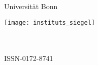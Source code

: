 %
%
%
{\thispagestyle{empty}
  \addtolength{\oddsidemargin}{1.0cm}\addtolength{\topmargin}{1.0cm}
  \rmfamily\setlength{\parindent}{0pt}
  \begin{center}
    {\fontsize{44}{50}\selectfont
      Universität Bonn}

    \vspace*{20pt}

    \begin{singlespace}
      \fontsize{30}{40}\selectfont
      \InstituteName
    \end{singlespace}

    \vspace*{40pt}

    \begin{onehalfspace}
      \bfseries\huge
      \thesistitle
    \end{onehalfspace}

    \vspace*{20pt}

    {\LARGE
      \thesisauthor
    }
  \end{center}

  \vspace*{\fill}

  \thesisabstract

  \vspace*{\fill}

  {\normalfont\normalsize
    \parbox{0.3\textwidth}{\InstituteAddress}
    \parbox{0.4\textwidth}{%
      \centering
      \texttt{[image: instituts\_siegel]}
    }
    \parbox{0.3\textwidth}{%
      \thesisnumber\\
      \thesismonth{} \thesisyear\\
      ISSN-0172-8741
    }
  }
}
